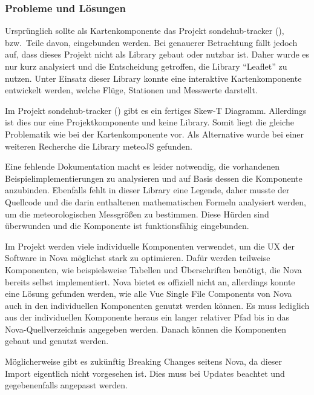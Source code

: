 \newpage

\subsubsection{Probleme und Lösungen}

Ursprünglich sollte als Kartenkomponente das Projekt sondehub-tracker (\cite{sondehub-tracker}), bzw.\ Teile davon, eingebunden werden.
Bei genauerer Betrachtung fällt jedoch auf, dass dieses Projekt nicht als Library gebaut oder nutzbar ist.
Daher wurde es nur kurz analysiert und die Entscheidung getroffen, die Library \enquote{Leaflet} zu nutzen.
Unter Einsatz dieser Library konnte eine interaktive Kartenkomponente entwickelt werden, welche Flüge, Stationen und Messwerte darstellt.

Im Projekt sondehub-tracker (\cite{sondehub-tracker}) gibt es ein fertiges Skew-T Diagramm.
Allerdings ist dies nur eine Projektkomponente und keine Library.
Somit liegt die gleiche Problematik wie bei der Kartenkomponente vor.
Als Alternative wurde bei einer weiteren Recherche die Library meteoJS gefunden.

Eine fehlende Dokumentation macht es leider notwendig, die vorhandenen Beispielimplementierungen zu analysieren und auf Basis dessen die Komponente anzubinden.
Ebenfalls fehlt in dieser Library eine Legende, daher musste der Quellcode und die darin enthaltenen mathematischen Formeln analysiert werden, um die meteorologischen Messgrößen zu bestimmen.
Diese Hürden sind überwunden und die Komponente ist funktionsfähig eingebunden.

Im Projekt werden viele individuelle Komponenten verwendet, um die UX der Software in Nova möglichst stark zu optimieren.
Dafür werden teilweise Komponenten, wie beispielsweise Tabellen und Überschriften benötigt, die Nova bereits selbst implementiert.
Nova bietet es offiziell nicht an, allerdings konnte eine Lösung gefunden werden, wie alle Vue Single File Components von Nova auch in den individuellen Komponenten genutzt werden können.
Es muss lediglich aus der individuellen Komponente heraus ein langer relativer Pfad bis in das Nova-Quellverzeichnis angegeben werden.
Danach können die Komponenten gebaut und genutzt werden.

Möglicherweise gibt es zukünftig Breaking Changes seitens Nova, da dieser Import eigentlich nicht vorgesehen ist.
Dies muss bei Updates beachtet und gegebenenfalls angepasst werden.

